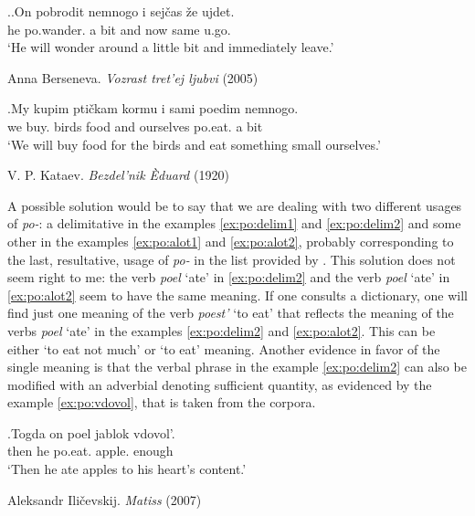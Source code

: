 \ex.\label{ex:po:abit}\ag.On pobrodit nemnogo i sej\v{c}as \v{z}e ujdet.\\
he po.wander. {a bit} and now same u.go.\\
\vspace{0.5em}
`He will wonder around a little bit and immediately leave.'
\begin{flushright}
\vspace{-0.5em}
Anna Berseneva. \textit{Vozrast tret'ej ljubvi} (2005)
\end{flushright}
\bg.My kupim pti\v{c}kam kormu i sami poedim nemnogo.\\
we buy. birds food and ourselves po.eat. {a bit}\\
\vspace{0.5em}
`We will buy food for the birds and eat something small ourselves.'
\begin{flushright}
\vspace{-0.5em}
V. P. Kataev. \textit{Bezdel'nik \`{E}duard} (1920)
\end{flushright}

A possible solution would be to say that we are dealing with two different usages of \textit{po-}: a delimitative in the examples \ref{ex:po:delim1} and \ref{ex:po:delim2} and some other in the examples \ref{ex:po:alot1} and \ref{ex:po:alot2}, probably corresponding to the last, resultative, usage of \textit{po-} in the list provided by \citet{Shvedova:82}. This solution does not seem right to me: the verb \textit{poel} `ate' in \ref{ex:po:delim2} and the verb \textit{poel} `ate' in \ref{ex:po:alot2} seem to have the same meaning. If one consults a dictionary, one will find just one meaning of the verb \textit{poest'} `to eat' that reflects the meaning of the verbs \textit{poel} `ate' in the examples \ref{ex:po:delim2} and \ref{ex:po:alot2}. This can be either `to eat not much' \citep{Ushakov:50} or `to eat' \citep{Efremova:00} meaning. Another evidence in favor of the single meaning is that the verbal phrase in the example \ref{ex:po:delim2} can also be modified with an adverbial denoting sufficient quantity, as evidenced by the example \ref{ex:po:vdovol}, that is taken from the corpora.

\exg.\label{ex:po:vdovol}Togda on poel jablok vdovol'.\\
then he po.eat. apple. enough\\
\vspace{0.5em}
`Then he ate apples to his heart's content.'
\begin{flushright}
\vspace{-0.5em}
Aleksandr Ili\v{c}evskij. \textit{Matiss} (2007)
\end{flushright}

